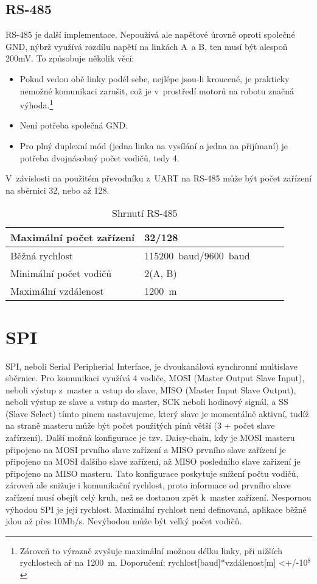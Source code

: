 \subsection{RS-485} %
RS-485 je další implementace.
Nepoužívá ale napěťové úrovně oproti společné GND, nýbrž využívá rozdílu napětí na linkách A~a B, ten musí být alespoň 200mV.
To způsobuje několik věcí:
\begin{itemize}
	\item Pokud vedou obě linky podél sebe, nejlépe jsou-li kroucené, je prakticky nemožné komunikaci zarušit, což je v~prostředí motorů na robotu značná výhoda.\footnote{Zároveň to výrazně zvyšuje maximální možnou délku linky, při nižších rychlostech ař na 1200~m. Doporučení: rychlost[baud]*vzdálenost[m] <+/-10$^{8}$}   
	\item Není potřeba společná GND.
	\item Pro plný duplexní mód (jedna linka na vysílání a jedna na přijímaní) je potřeba dvojnásobný počet vodičů, tedy 4.
\end{itemize}
V~závislosti na použitém převodníku z~UART na RS-485 může být počet zařízení na sběrnici 32, nebo až 128.
\cite{RS-485}
\begin{table}[h]
	
	\centering
	\begin{tabular}{|l|l|l|l|l|} \hline
		Maximální počet zařízení      & 32/128              \\ \hline
		Běžná rychlost                & 115200~baud/9600~baud        \\ \hline
		Minimální počet vodičů        & 2(A, B) \\ \hline
		Maximální vzdálenost		  & 1200~m \\ \hline
	\end{tabular}
	\caption{Shrnutí RS-485}
\end{table}

\section{SPI}
SPI, neboli Serial Peripherial Interface, je dvoukanálová synchronní multislave sběrnice.
Pro komunikaci využívá 4 vodiče, MOSI (Master Output Slave Input), neboli výstup z~master a vstup do slave, MISO (Master Input Slave Output), neboli výstup ze slave a vstup do master, SCK neboli hodinový signál, a SS (Slave Select) tímto pinem nastavujeme, který slave je momentálně aktivní, tudíž na straně masteru může být počet použitých pinů větší (3 + počet slave zařírzení).
Další možná konfigurace je tzv. Daisy-chain, kdy je  MOSI masteru připojeno na MOSI prvního slave zařízení a MISO prvního slave zařízení je připojeno na MOSI dalšího slave zařízení, až MISO posledního slave zařízení je připojeno na MISO masteru.
Tato konfigurace poskytuje snížení počtu vodičů, zároveň ale snižuje i komunikační rychlost, proto informace od prvního slave zařízení musí obejít celý kruh, než se dostanou zpět k~master zařízení.
Nespornou výhodou SPI je její rychlost.
Maximální rychlost není definovaná, aplikace běžně jdou až přes 10Mb/s.
Nevýhodou může být velký počet vodičů.
\cite{nxp:AN2847}

